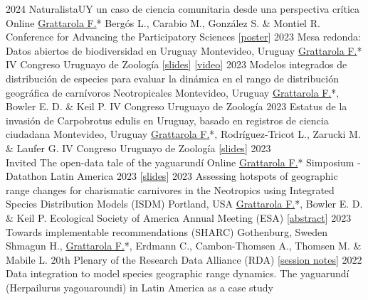 \documentclass[9pt]{developercv} %
\begin{document}
\begin{entrylist}
	\entrylong
		{2024}
		{NaturalistaUY un caso de ciencia comunitaria desde una perspectiva crítica}
		{Online}
		{\underline{Grattarola F.}* Bergós L., Carabio M., González S. \& Montiel R. \slashsep Conference for Advancing the Participatory Sciences [\href{https://bienflorencia.github.io/CAPS_2024_NaturalistaUY}{poster}]}
	\entrylong
		{2023}
		{Mesa redonda: Datos abiertos de biodiversidad en Uruguay}
		{Montevideo, Uruguay}
		{\underline{Grattarola F.}* \slashsep IV Congreso Uruguayo de Zoología [\href{https://flograttarola.com/talk/datos-abiertos-de-biodiversidad-en-uruguay/Mesa_redonda_datos_abiertosCUZ2023.pdf}{slides}] [\href{https://youtu.be/3hzSsP84u88}{video}]}
	\entrylong
		{2023}
		{Modelos integrados de distribución de especies para evaluar la dinámica en el rango de distribución geográfica de carnívoros Neotropicales}
		{Montevideo, Uruguay}
		{\underline{Grattarola F.}*, Bowler E. D. \& Keil P. \slashsep IV Congreso Uruguayo de Zoología}
	\entrylong
		{2023}
		{Estatus de la invasión de Carpobrotus edulis en Uruguay, basado en registros de ciencia ciudadana}
		{Montevideo, Uruguay}
		{\underline{Grattarola F.}*, Rodríguez-Tricot L., Zarucki M. \& Laufer G. \slashsep IV Congreso Uruguayo de Zoología [\href{https://flograttarola.com/talk/estatus-de-la-invasion-de-carpobrotus-edulis-en-uruguay-basado-en-registros-de-ciencia-ciudadana/Carpobrotus_edulis_CUZ2023.pdf}{slides}]}
		\entrylong
		{2023\\\footnotesize{Invited}}
		{The open-data tale of the yaguarundí}
		{Online}
		{\underline{Grattarola F.}* \slashsep Simposium - Datathon Latin America 2023 [\href{https://flograttarola.com/talk/el-cuento-del-yaguarundi-segun-los-datos-abiertos/simposio_DatatonLatam_2023.pdf}{slides}]}
		\entrylong
		{2023}
		{Assessing hotspots of geographic range changes for charismatic carnivores in the Neotropics using Integrated Species Distribution Models (ISDM)}
		{Portland, USA}
		{\underline{Grattarola F.}*, Bowler E. D. \& Keil P. \slashsep Ecological Society of America Annual Meeting (ESA) [\href{https://esa2023.eventscribe.net/fsPopup.asp?PresentationID=1276990&query=grattarola&Mode=presInfo}{abstract}]}
	\entrylong
		{2023}
		{Towards implementable recommendations (SHARC)}
		{Gothenburg, Sweden}
		{Shmagun H., \underline{Grattarola F.}*, Erdmann C., Cambon-Thomsen A., Thomsen M.  \& Mabile L. \slashsep 20th Plenary of the Research Data Alliance (RDA)  [\href{https://docs.google.com/document/d/1oQRp8EjHEOrmLj5QlqANM31q-AQa-CvJ804TRc9Re6I/edit?usp=sharing}{session notes}]}
	\entrylong
		{2022}
		{Data integration to model species geographic range dynamics. The yaguarundí (Herpailurus yagouaroundi) in Latin America as a case study}

\end{entrylist}
\end{document}
